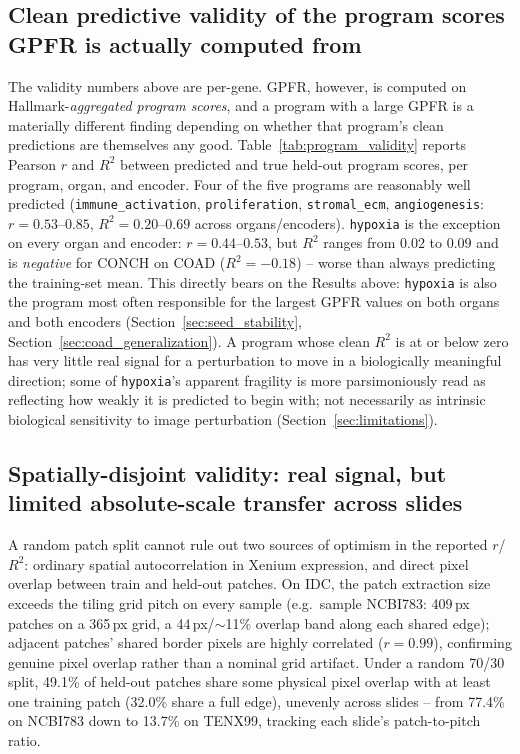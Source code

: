 \documentclass[11pt]{article}
\begin{document}
\subsection{Clean predictive validity of the program scores GPFR is actually computed from}
\label{sec:program_validity}
The validity numbers above are per-gene. GPFR, however, is computed on Hallmark-\emph{aggregated program scores}, and a program with a large GPFR is a materially different finding depending on whether that program's clean predictions are themselves any good. Table~\ref{tab:program_validity} reports Pearson $r$ and $R^2$ between predicted and true held-out program scores, per program, organ, and encoder. Four of the five programs are reasonably well predicted (\texttt{immune\_activation}, \texttt{proliferation}, \texttt{stromal\_ecm}, \texttt{angiogenesis}: $r=0.53$--$0.85$, $R^2=0.20$--$0.69$ across organs/encoders). \texttt{hypoxia} is the exception on every organ and encoder: $r=0.44$--$0.53$, but $R^2$ ranges from $0.02$ to $0.09$ and is \emph{negative} for CONCH on COAD ($R^2=-0.18$) -- worse than always predicting the training-set mean. This directly bears on the Results above: \texttt{hypoxia} is also the program most often responsible for the largest GPFR values on both organs and both encoders (Section~\ref{sec:seed_stability}, Section~\ref{sec:coad_generalization}). A program whose clean $R^2$ is at or below zero has very little real signal for a perturbation to move in a biologically meaningful direction; some of \texttt{hypoxia}'s apparent fragility is more parsimoniously read as reflecting how weakly it is predicted to begin with; not necessarily as intrinsic biological sensitivity to image perturbation (Section~\ref{sec:limitations}).



\subsection{Spatially-disjoint validity: real signal, but limited absolute-scale transfer across slides}
\label{sec:loso}
A random patch split cannot rule out two sources of optimism in the reported $r$/$R^2$: ordinary spatial autocorrelation in Xenium expression, and direct pixel overlap between train and held-out patches. On IDC, the patch extraction size exceeds the tiling grid pitch on every sample (e.g.\ sample NCBI783: 409\,px patches on a 365\,px grid, a 44\,px/$\sim$11\% overlap band along each shared edge); adjacent patches' shared border pixels are highly correlated ($r=0.99$), confirming genuine pixel overlap rather than a nominal grid artifact. Under a random 70/30 split, 49.1\% of held-out patches share some physical pixel overlap with at least one training patch (32.0\% share a full edge), unevenly across slides -- from 77.4\% on NCBI783 down to 13.7\% on TENX99, tracking each slide's patch-to-pitch ratio.
\end{document}
